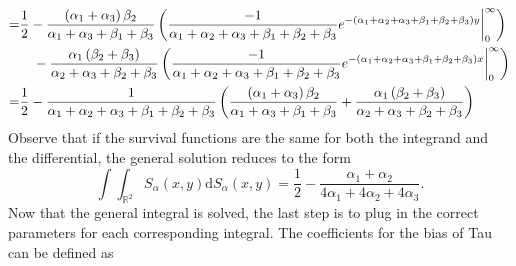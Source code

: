 \begin{align*}
    =&\frac{1}{2}-\frac{\left(\alpha_1+\alpha_3\right)\beta_2}{\alpha_1+\alpha_3+\beta_1+\beta_3}\left(\frac{-1}{\alpha_1+\alpha_2+\alpha_3+\beta_1+\beta_2+\beta_3}e^{-\left(\alpha_1+\alpha_2+\alpha_3+\beta_1+\beta_2+\beta_3\right)y}\bigg|_0^{\infty}\right)\\
    &\hspace{3.5mm}-\frac{\alpha_1\left(\beta_2+\beta_3\right)}{\alpha_2+\alpha_3+\beta_2+\beta_3}\left(\frac{-1}{\alpha_1+\alpha_2+\alpha_3+\beta_1+\beta_2+\beta_3}e^{-\left(\alpha_1+\alpha_2+\alpha_3+\beta_1+\beta_2+\beta_3\right)x}\bigg|_0^{\infty}\right)\\
    =&\frac{1}{2}-\frac{1}{\alpha_1+\alpha_2+\alpha_3+\beta_1+\beta_2+\beta_3}\left(\frac{\left(\alpha_1+\alpha_3\right)\beta_2}{\alpha_1+\alpha_3+\beta_1+\beta_3}+\frac{\alpha_1\left(\beta_2+\beta_3\right)}{\alpha_2+\alpha_3+\beta_2+\beta_3}\right)
\end{align*}
Observe that if the survival functions are the same for both the integrand and the differential, the general solution reduces to the form $$\int\int_{\mathbb{R}^2}S_{\alpha}\left(x,y\right)\mathrm{d}S_{\alpha}\left(x,y\right)=\frac{1}{2}-\frac{\alpha_1+\alpha_2}{4\alpha_1+4\alpha_2+4\alpha_3}.$$
Now that the general integral is solved, the last step is to plug in the correct parameters for each corresponding integral. The coefficients for the bias of Tau can be defined as
